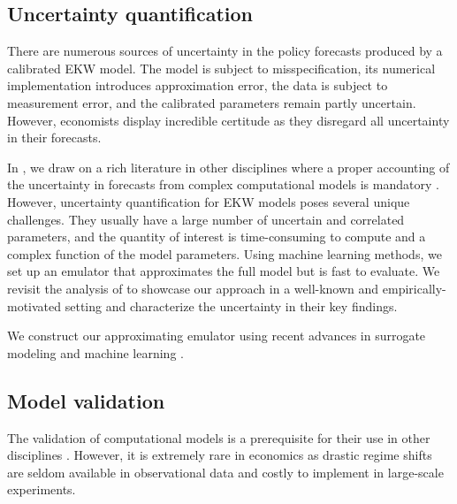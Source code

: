 \subsection{Uncertainty quantification}
There are numerous sources of uncertainty in the policy forecasts produced by a calibrated EKW model. The model is subject to misspecification, its numerical implementation introduces approximation error, the data is subject to measurement error, and the calibrated parameters remain partly uncertain. However, economists display incredible certitude as they disregard all uncertainty \citep{Manski.2013} in their forecasts.

In \citet{Eisenhauer.2020d}, we draw on a rich literature in other disciplines where a proper accounting of the uncertainty in forecasts from complex computational models is mandatory \citep{Saltelli.2004, Saltelli.2008, Smith.2014}. However, uncertainty quantification for EKW models poses several unique challenges. They usually have a large number of uncertain and correlated parameters, and the quantity of interest is time-consuming to compute and a complex function of the model parameters. Using machine learning methods, we set up an emulator that approximates the full model but is fast to evaluate. We revisit the analysis of \citet{Keane.1994, Keane.1997} to showcase our approach in a well-known and empirically-motivated setting and characterize the uncertainty in their key findings.

We construct our approximating emulator using recent advances in surrogate modeling \citep{Forrester.2008} and machine learning \citep{Hastie.2008, Murphy.2012}.
\subsection{Model validation}
The validation of computational models is a prerequisite for their use in other disciplines \citep{Morin.2012, Oberkampf.2010}. However, it is extremely rare in economics as drastic regime shifts are seldom available in observational data and costly to implement in large-scale experiments.

